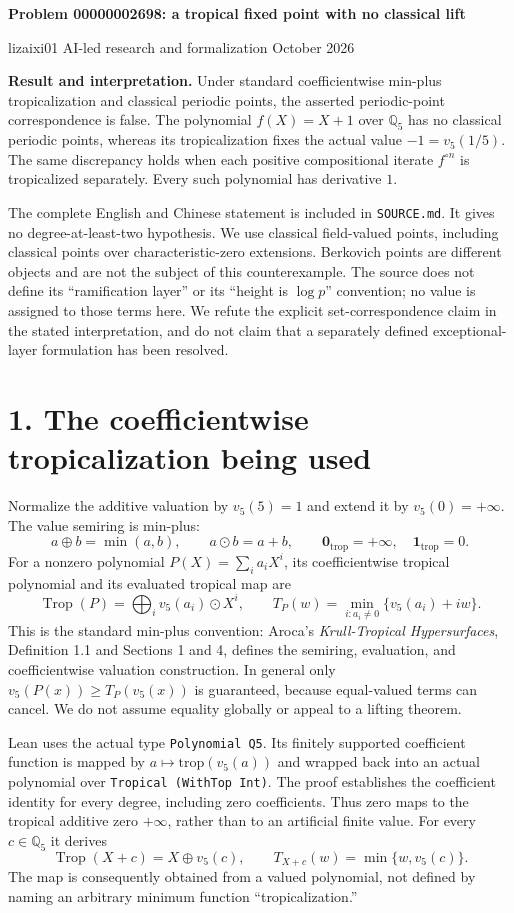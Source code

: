 \documentclass[10pt]{article}
\newcommand{\Q}{\mathbb Q_5}
\newcommand{\Trop}{\operatorname{Trop}}
\begin{document}
\begin{center}
{\Large\bfseries Problem 00000002698: a tropical fixed point with no classical lift}

lizaixi01 \quad AI-led research and formalization  October 2026
\end{center}
\textbf{Result and interpretation.} Under standard coefficientwise min-plus tropicalization and classical periodic points, the asserted periodic-point correspondence is false. The polynomial $f(X)=X+1$ over $\Q$ has no classical periodic points, whereas its tropicalization fixes the actual value $-1=v_5(1/5)$. The same discrepancy holds when each positive compositional iterate $f^{\circ n}$ is tropicalized separately. Every such polynomial has derivative $1$.

The complete English and Chinese statement is included in \texttt{SOURCE.md}. It gives no degree-at-least-two hypothesis. We use classical field-valued points, including classical points over characteristic-zero extensions. Berkovich points are different objects and are not the subject of this counterexample. The source does not define its ``ramification layer'' or its ``height is $\log p$'' convention; no value is assigned to those terms here. We refute the explicit set-correspondence claim in the stated interpretation, and do not claim that a separately defined exceptional-layer formulation has been resolved.

\section*{1. The coefficientwise tropicalization being used}
Normalize the additive valuation by $v_5(5)=1$ and extend it by $v_5(0)=+\infty$. The value semiring is min-plus:
\[
a\oplus b=\min(a,b),\qquad a\odot b=a+b,
\qquad \mathbf{0}_{\mathrm{trop}}=+\infty,\quad\mathbf{1}_{\mathrm{trop}}=0.
\]
For a nonzero polynomial $P(X)=\sum_i a_iX^i$, its coefficientwise tropical polynomial and its evaluated tropical map are
\[
\Trop(P)=\bigoplus_i v_5(a_i)\odot X^i,
\qquad T_P(w)=\min_{i:a_i\ne0}\{v_5(a_i)+iw\}.
\]
This is the standard min-plus convention: Aroca's \emph{Krull-Tropical Hypersurfaces}, Definition 1.1 and Sections 1 and 4, defines the semiring, evaluation, and coefficientwise valuation construction. In general only $v_5(P(x))\ge T_P(v_5(x))$ is guaranteed, because equal-valued terms can cancel. We do not assume equality globally or appeal to a lifting theorem.

Lean uses the actual type \texttt{Polynomial Q5}. Its finitely supported coefficient function is mapped by $a\mapsto\mathrm{trop}(v_5(a))$ and wrapped back into an actual polynomial over \texttt{Tropical (WithTop Int)}. The proof establishes the coefficient identity for every degree, including zero coefficients. Thus zero maps to the tropical additive zero $+\infty$, rather than to an artificial finite value. For every $c\in\Q$ it derives
\[
\Trop(X+c)=X\oplus v_5(c),\qquad T_{X+c}(w)=\min\{w,v_5(c)\}.
\]
The map is consequently obtained from a valued polynomial, not defined by naming an arbitrary minimum function ``tropicalization.''
\end{document}
